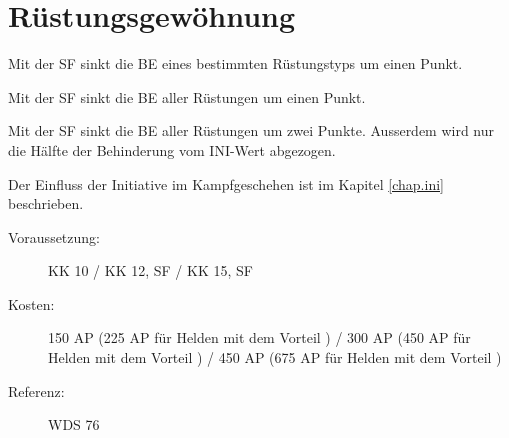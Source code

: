 \section{Rüstungsgewöhnung}
\label{sf.ruestungsgewoehnung}
Mit der SF  sinkt die BE eines bestimmten Rüstungstyps um einen Punkt.

Mit der SF  sinkt die BE aller Rüstungen um einen Punkt.

Mit der SF  sinkt die BE aller Rüstungen um zwei Punkte.
Ausserdem wird nur die Hälfte der Behinderung vom INI-Wert abgezogen.

Der Einfluss der Initiative im Kampfgeschehen ist im Kapitel \ref{chap.ini} beschrieben.
\begin{description}
    \item[Voraussetzung:]
        KK 10 / KK 12, SF  / KK 15, SF 
    \item [Kosten:]
        150 AP (225 AP für Helden mit dem Vorteil ) / 300 AP (450 AP für Helden mit dem Vorteil ) / 450 AP (675 AP für Helden mit dem Vorteil )
    \item [Referenz:]
        WDS 76
\end{description}
